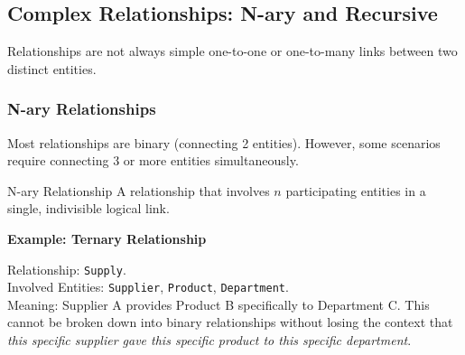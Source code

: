 \subsection{Complex Relationships: N-ary and Recursive}
Relationships are not always simple one-to-one or one-to-many links between two distinct entities.

\subsubsection{N-ary Relationships}
Most relationships are binary (connecting 2 entities). However, some scenarios require connecting 3 or more entities simultaneously.

\begin{defbox}{N-ary Relationship}
A relationship that involves $n$ participating entities in a single, indivisible logical link.
\end{defbox}

\vspace{0.2cm}
\begin{example}{\textbf{Example: Ternary Relationship}}



\vspace{0.2cm}
Relationship: \texttt{Supply}.\\
Involved Entities: \texttt{Supplier}, \texttt{Product}, \texttt{Department}.\\
Meaning: Supplier A provides Product B specifically to Department C. This cannot be broken down into binary relationships without losing the context that \textit{this specific supplier gave this specific product to this specific department}.

\vs

\begin{center}
\end{center}
\end{example}

